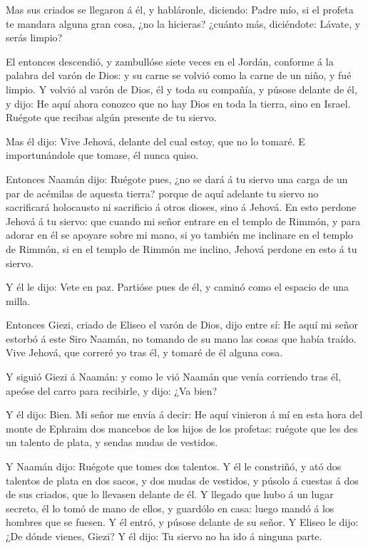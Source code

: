  Mas sus criados se llegaron á él, y habláronle, diciendo:
Padre mío, si el profeta te mandara alguna gran cosa, ¿no la hicieras?
¿cuánto más, diciéndote: Lávate, y serás limpio?

 El entonces descendió, y zambullóse siete veces en el
Jordán, conforme á la palabra del varón de Dios: y su carne se volvió
como la carne de un niño, y fué limpio.  Y volvió al varón
de Dios, él y toda su compañía, y púsose delante de él, y dijo: He aquí
ahora conozco que no hay Dios en toda la tierra, sino en Israel. Ruégote
que recibas algún presente de tu siervo.

 Mas él dijo: Vive Jehová, delante del cual estoy, que no
lo tomaré. E importunándole que tomase, él nunca quiso.

 Entonces Naamán dijo: Ruégote pues, ¿no se dará á tu
siervo una carga de un par de acémilas de aquesta tierra? porque de aquí
adelante tu siervo no sacrificará holocausto ni sacrificio á otros
dioses, sino á Jehová.  En esto perdone Jehová á tu siervo:
que cuando mi señor entrare en el templo de Rimmón, y para adorar en él
se apoyare sobre mi mano, si yo también me inclinare en el templo de
Rimmón, si en el templo de Rimmón me inclino, Jehová perdone en esto á
tu siervo.

 Y él le dijo: Vete en paz. Partióse pues de él, y caminó
como el espacio de una milla.

 Entonces Giezi, criado de Eliseo el varón de Dios, dijo
entre sí: He aquí mi señor estorbó á este Siro Naamán, no tomando de su
mano las cosas que había traído. Vive Jehová, que correré yo tras él, y
tomaré de él alguna cosa.

 Y siguió Giezi á Naamán: y como le vió Naamán que venía
corriendo tras él, apeóse del carro para recibirle, y dijo: ¿Va bien?

 Y él dijo: Bien. Mi señor me envía á decir: He aquí
vinieron á mí en esta hora del monte de Ephraim dos mancebos de los
hijos de los profetas: ruégote que les des un talento de plata, y sendas
mudas de vestidos.

 Y Naamán dijo: Ruégote que tomes dos talentos. Y él le
constriñó, y ató dos talentos de plata en dos sacos, y dos mudas de
vestidos, y púsolo á cuestas á dos de sus criados, que lo llevasen
delante de él.  Y llegado que hubo á un lugar secreto, él
lo tomó de mano de ellos, y guardólo en casa: luego mandó á los hombres
que se fuesen.  Y él entró, y púsose delante de su señor. Y
Eliseo le dijo: ¿De dónde vienes, Giezi? Y él dijo: Tu siervo no ha ido
á ninguna parte.


